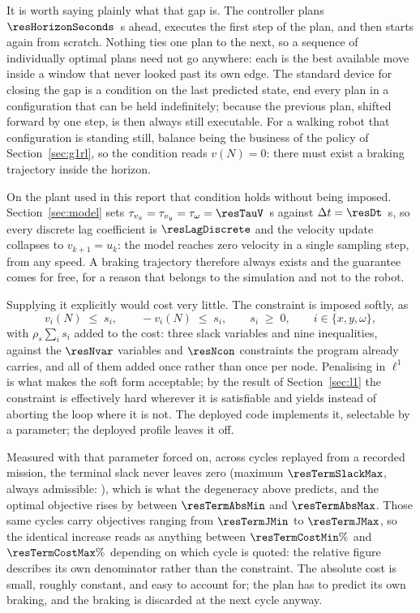 \documentclass[11pt,a4paper]{article}
\begin{document}
It is worth saying plainly what that gap is. The controller plans $\resHorizonSeconds$~s ahead, executes the
first step of the plan, and then starts again from scratch. Nothing ties one plan to the next, so a sequence
of individually optimal plans need not go anywhere: each is the best available move inside a window that
never looked past its own edge. The standard device for closing the gap is a condition on the last predicted
state, end every plan in a configuration that can be held indefinitely; because the previous plan,
shifted forward by one step, is then always still executable. For a walking robot that configuration is
standing still, balance being the business of the policy of Section~\ref{sec:g1rl}, so the condition reads
$v(N)=0$: there must exist a braking trajectory inside the horizon.

On the plant used in this report that condition holds without being imposed. Section~\ref{sec:model} sets
$\tau_{v_x}=\tau_{v_y}=\tau_\omega=\resTauV$~s against $\Delta t=\resDt$~s, so every discrete lag
coefficient is $\resLagDiscrete$
and the velocity update collapses to $v_{k+1}=u_k$: the model reaches zero velocity in a single sampling
step, from any speed. A braking trajectory therefore always exists and the guarantee comes for free, for
a reason that belongs to the simulation and not to the robot.

Supplying it explicitly would cost very little. The constraint is imposed softly, as
\begin{equation}
  v_i(N)\;\le\;s_i,\qquad -v_i(N)\;\le\;s_i,\qquad s_i\;\ge\;0,\qquad i\in\{x,y,\omega\},
  \label{eq:terminal}
\end{equation}
with $\rho_s\sum_i s_i$ added to the cost: three slack variables and nine inequalities, against the
$\resNvar$ variables and $\resNcon$ constraints the program already carries, and all of them added once
rather than once per node. Penalising in $\ell^1$ is what makes the soft form acceptable; by the result
of Section~\ref{sec:l1} the constraint is effectively hard wherever it is satisfiable and yields instead of
aborting the loop where it is not. The deployed code implements it, selectable by a parameter; the deployed
profile leaves it off.

Measured with that parameter forced on, across cycles replayed from a recorded mission, the terminal slack
never leaves zero (maximum $\resTermSlackMax$, always admissible: \resTermFeasible), which is what the
degeneracy above predicts, and the optimal objective rises by between $\resTermAbsMin$ and $\resTermAbsMax$.
Those same cycles carry objectives ranging from $\resTermJMin$ to $\resTermJMax$, so the identical increase
reads as anything between $\resTermCostMin\%$ and $\resTermCostMax\%$ depending on which cycle is quoted:
the relative figure describes its own denominator rather than the constraint. The absolute cost is small,
roughly constant, and easy to account for; the plan has to predict its own braking, and the braking is
discarded at the next cycle anyway.
\end{document}
